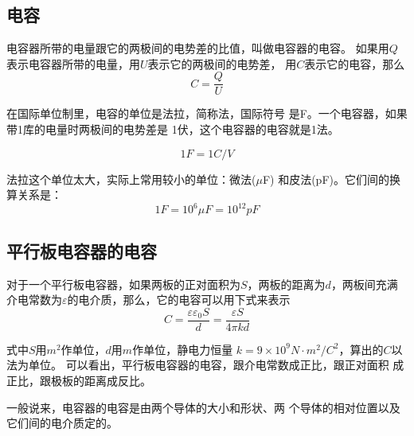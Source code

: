 \subsection{电容}
\begin{definition}
    电容器所带的电量跟它的两极间的电势差的比值，叫做电容器的电容。
    如果用$Q$表示电容器所带的电量，用$ U $表示它的两极间的电势差，
    用$ C $表示它的电容，那么
    \begin{equation}
        C=\frac{Q}{U}
    \end{equation}
\end{definition}

在国际单位制里，电容的单位是法拉，简称法，国际符号
是F。一个电容器，如果带1库的电量时两极间的电势差是
1伏，这个电容器的电容就是1法。

\begin{equation}
    1F=1C/V
\end{equation}

法拉这个单位太大，实际上常用较小的单位：微法($\mu$F)
和皮法(pF)。它们间的换算关系是：
\begin{equation}
    1F=10^6\mu F=10^{12}pF
\end{equation}

\subsection{平行板电容器的电容}
\begin{theorem}
    对于一个平行板电容器，如果两板的正对面积为$S$，两板的距离为$d$，两板间充满
    介电常数为$\varepsilon$的电介质，那么，它的电容可以用下式来表示
    \begin{equation}
        C=\frac{\varepsilon\varepsilon_0S}{d}=\frac{\varepsilon S}{4\pi kd}
    \end{equation}
\end{theorem}

式中$S$用$m^2$作单位，$d$用$m$作单位，静电力恒量
$k=9\times 10^9N\cdot m^2/C^2$，算出的$C$以法为单位。
可以看出，平行板电容器的电容，跟介电常数成正比，跟正对面积
成正比，跟极板的距离成反比。

一般说来，电容器的电容是由两个导体的大小和形状、两
个导体的相对位置以及它们间的电介质定的。


